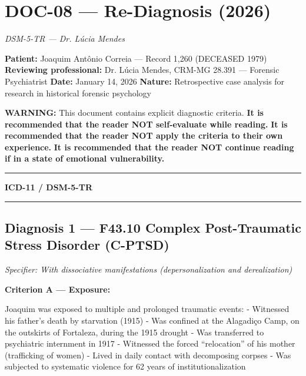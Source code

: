 \section*{\textbf{DOC-08} --- Re-Diagnosis (2026)}

\noindent \textit{DSM-5-TR --- Dr. Lúcia Mendes}

\noindent \textbf{Patient:} Joaquim Antônio Correia --- Record 1,260 (DECEASED 1979)
\textbf{Reviewing professional:} Dr. Lúcia Mendes, CRM-MG 28.391 --- Forensic Psychiatrist
\textbf{Date:} January 14, 2026
\textbf{Nature:} Retrospective case analysis for research in historical forensic psychology

\noindent \textbf{WARNING:} This document contains explicit diagnostic criteria.
\textbf{It is recommended that the reader NOT self-evaluate while reading.}
\textbf{It is recommended that the reader NOT apply the criteria to their own experience.}
\textbf{It is recommended that the reader NOT continue reading if in a state of emotional vulnerability.}

\vspace{0.5em}\noindent\rule{\textwidth}{0.5pt}\vspace{0.5em}

\noindent \textbf{ICD-11 / DSM-5-TR}

\vspace{0.5em}\noindent\rule{\textwidth}{0.5pt}\vspace{0.5em}

\subsection*{Diagnosis 1 --- F43.10 Complex Post-Traumatic Stress Disorder (C-PTSD)}
\textit{Specifier: With dissociative manifestations (depersonalization and derealization)}

\noindent \textbf{Criterion A --- Exposure:}

\noindent Joaquim was exposed to multiple and prolonged traumatic events:
- Witnessed his father's death by starvation (1915)
- Was confined at the Alagadiço Camp, on the outskirts of Fortaleza, during the 1915 drought
- Was transferred to psychiatric internment in 1917
- Witnessed the forced \textquotedblleft{}relocation\textquotedblright{} of his mother (trafficking of women)
- Lived in daily contact with decomposing corpses
- Was subjected to systematic violence for 62 years of institutionalization

